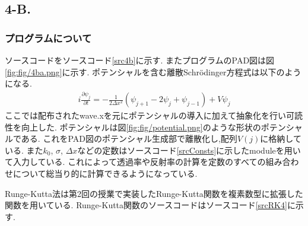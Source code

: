 \subsection*{4-B.}
\subsubsection*{プログラムについて}
ソースコードをソースコード\ref{src4b}に示す.
またプログラムのPAD図は図\ref{fig:fig/4ba.png}に示す.
ポテンシャルを含む離散Schr\"{o}dinger方程式は以下のようになる.
\begin{align}
  i\frac{\partial\psi_j}{\partial t}=-\frac{1}{2\Delta x^2}(\psi_{j+1}-2\psi_j+\psi_{j-1})+V\psi_j
\end{align}
ここでは配布されたwave.xを元にポテンシャルの導入に加えて抽象化を行い可読性を向上した.
ポテンシャルは図\ref{fig:fig/potential.png}のような形状のポテンシャルである.
これをPAD図のポテンシャル生成部で離散化し,配列$V(j)$に格納している.
また$k_0$, $\sigma$, $\Delta x$などの定数はソースコード\ref{srcConsts}に示したmoduleを用いて入力している.
これによって透過率や反射率の計算を定数のすべての組み合わせについて総当り的に計算できるようになっている.

Runge-Kutta法は第2回の授業で実装したRunge-Kutta関数を複素数型に拡張した関数を用いている.
Runge-Kutta関数のソースコードはソースコード\ref{srcRK4}に示す.
